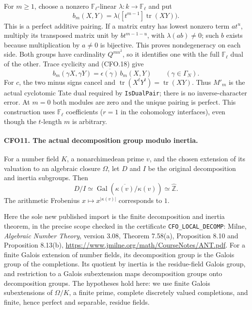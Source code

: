 For $m\ge1$, choose a nonzero $\mathbb F_\ell$-linear
$\lambda:k\to\mathbb F_\ell$ and put
\[
 b_m(X,Y)=\lambda\bigl([t^{m-1}]\operatorname{tr}(XY)\bigr).
                                                                    \tag{CFO.19}
\]
This is a perfect additive pairing.  If a matrix entry has
lowest nonzero term $a t^u$, multiply its transposed matrix
unit by $b t^{m-1-u}$, with $\lambda(ab)\ne0$; such $b$
exists because multiplication by $a\ne0$ is bijective.
This proves nondegeneracy on each side.  Both groups have
cardinality $Q^{mn^2}$, so it identifies one with the full
$\mathbb F_\ell$ dual of the other.  Trace cyclicity and
(CFO.18) give
\[
 b_m(\gamma X,\gamma Y)=\overline{\epsilon(\gamma)}\,b_m(X,Y)
 \qquad(\gamma\in\Gamma_N).                                     \tag{CFO.20}
\]
For $c$, the two minus signs cancel and
$\operatorname{tr}(X^tY^t)=\operatorname{tr}(XY)$.
Thus $M'_m$ is the actual cyclotomic Tate dual required by
\texttt{IsDualPair}; there is no inverse-character error.
At $m=0$ both modules are zero and the unique pairing is
perfect.  This construction uses $\mathbb F_\ell$ coefficients
($r=1$ in the cohomology interfaces), even though the
$t$-length $m$ is arbitrary.

\paragraph{CFO11. The actual decomposition group modulo inertia.}
\label{claim:CFO11}
For a number field $K$, a nonarchimedean prime $v$, and the
chosen extension of its valuation to an algebraic closure
$\Omega$, let $D$ and $I$ be the original decomposition and
inertia subgroups.  Then
\[
 D/I\simeq\operatorname{Gal}(\overline{\kappa(v)}/\kappa(v))
       \simeq\widehat{\mathbb Z}.                               \tag{CFO.21}
\]
The arithmetic Frobenius $x\mapsto x^{|\kappa(v)|}$ corresponds
to $1$.

Here the sole new published import is the finite decomposition
and inertia theorem, in the precise scope checked in the
certificate \texttt{CFO\_LOCAL\_DECOMP}: Milne,
\emph{Algebraic Number Theory}, version 3.08,
Theorem 7.58(a), Proposition 8.10 and Proposition 8.13(b),
\url{https://www.jmilne.org/math/CourseNotes/ANT.pdf}.
For a finite Galois extension of number fields, its
decomposition group is the Galois group of the completions.
Its quotient by inertia is the residue-field Galois group,
and restriction to a Galois subextension maps decomposition
groups onto decomposition groups.  The hypotheses hold here:
we use finite Galois subextensions of $\Omega/K$, a finite
prime, complete discretely valued completions, and finite,
hence perfect and separable, residue fields.


